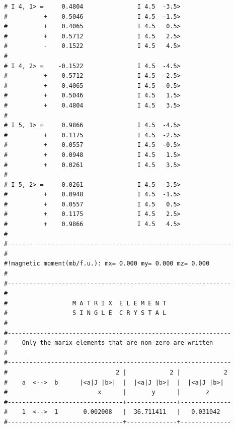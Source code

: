 \begin{enumerate}
{\begin{verbatim}
# I 4, 1> =     0.4804               I 4.5  -3.5>              
#          +    0.5046               I 4.5  -1.5>              
#          +    0.4065               I 4.5   0.5>              
#          +    0.5712               I 4.5   2.5>              
#          -    0.1522               I 4.5   4.5>              
#                                                              
# I 4, 2> =    -0.1522               I 4.5  -4.5>              
#          +    0.5712               I 4.5  -2.5>              
#          +    0.4065               I 4.5  -0.5>              
#          +    0.5046               I 4.5   1.5>              
#          +    0.4804               I 4.5   3.5>              
#                                                              
# I 5, 1> =     0.9866               I 4.5  -4.5>              
#          +    0.1175               I 4.5  -2.5>              
#          +    0.0557               I 4.5  -0.5>              
#          +    0.0948               I 4.5   1.5>              
#          +    0.0261               I 4.5   3.5>              
#                                                              
# I 5, 2> =     0.0261               I 4.5  -3.5>              
#          +    0.0948               I 4.5  -1.5>              
#          +    0.0557               I 4.5   0.5>              
#          +    0.1175               I 4.5   2.5>              
#          +    0.9866               I 4.5   4.5>              
#                                                              
#-------------------------------------------------------------- 
#
#!magnetic moment(mb/f.u.): mx= 0.000 my= 0.000 mz= 0.000
#
#-------------------------------------------------------------- 
#                                                              
#                  M A T R I X  E L E M E N T                  
#                  S I N G L E  C R Y S T A L                    
#                                                              
#--------------------------------------------------------------
#    Only the marix elements that are non-zero are written     
#                                                              
#--------------------------------------------------------------
#                              2 |            2 |            2 
#    a  <-->  b      |<a|J |b>|  |  |<a|J |b>|  |  |<a|J |b>|  
#                         x      |       y      |       z      
#--------------------------------+--------------+--------------
#    1  <-->  1       0.002008   |  36.711411   |   0.031042   
#--------------------------------+--------------+--------------

\end{verbatim}}
\end{enumerate}
